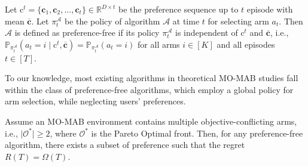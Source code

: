 
\begin{definition}
\label{def: pref_free_alg}
Let
$\boldsymbol{\mathrm{c}}^{t} = \{\boldsymbol{c}_1, \boldsymbol{c}_2, ..., \boldsymbol{c}_{t}\} \in \mathbb{R}^{D \times t}$ be the preference sequence up to $t$ episode with mean $\boldsymbol{\overline{c}}$. 
Let $\pi_t^{\mathcal{A}}$ be the policy of algorithm $\mathcal{A}$ at time $t$ for selecting arm $a_t$. 
Then $\mathcal{A}$ is defined as preference-free if its policy 
$\pi_t^{\mathcal{A}}$ is independent of $\boldsymbol{\mathrm{c}}^{t}$ and $\boldsymbol{\overline{c}}$, i.e., 
$\mathbb{P}_{\pi_t^{\mathcal{A}}} (a_t = i \mid \boldsymbol{\mathrm{c}}^{t}, \boldsymbol{\overline{c}}) = \mathbb{P}_{\pi_t^{\mathcal{A}}} (a_t = i)$
for all arms $i \in [K]$ and all episodes $t \in [T]$.
\end{definition} 

To our knowledge, most existing algorithms in theoretical MO-MAB studies \cite{drugan2013designing, busa2017multi, xu2023pareto, huyuk2021multi, cheng2024hierarchize} fall within the class of preference-free algorithms, which employ a global policy for arm selection, while neglecting users' preferences.


\begin{proposition}
\label{prop: lower_bd}
Assume an MO-MAB environment contains multiple objective-conflicting arms, i.e., $\vert \mathcal{O}^{*} \vert \geq 2$, where $\mathcal{O}^{*}$ is the Pareto Optimal front. 
Then, for any preference-free algorithm, there exists a subset of preference such that the regret $R(T) = \Omega(T)$. 
\end{proposition} 

